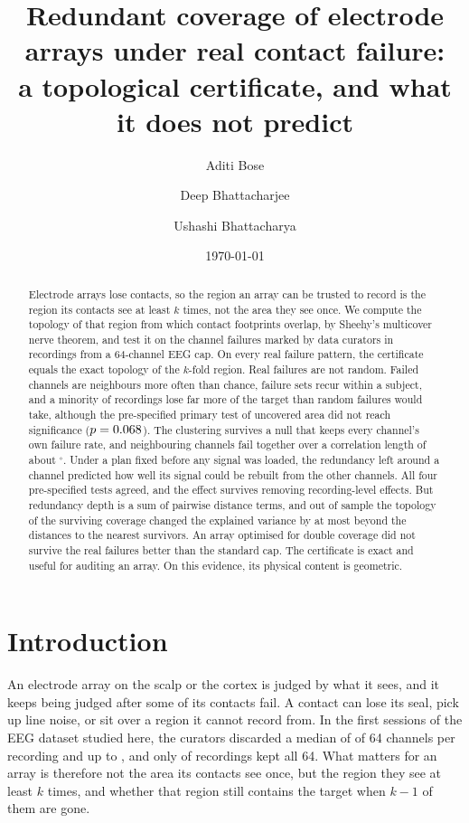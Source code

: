 \documentclass[11pt]{amsart}
\title[Redundant coverage under real contact failure]%
{Redundant coverage of electrode arrays under real contact failure:\\
a topological certificate, and what it does not predict}
\author{Aditi Bose}
\author[D. Bhattacharjee]{Deep Bhattacharjee}
\author[U. Bhattacharya]{Ushashi Bhattacharya}
\date{\today}
\theoremstyle{definition}
\theoremstyle{remark}
\begin{document}
\begin{abstract}
Electrode arrays lose contacts, so the region an array can be trusted to
record is the region its contacts see at least $k$ times, not the area they
see once. We compute the topology of that region from which contact
footprints overlap, by Sheehy's multicover nerve theorem, and test it on the
channel failures marked by data curators in \nRec{} recordings from a
64-channel EEG cap. On every real failure pattern, the certificate equals the
exact topology of the $k$-fold region. Real failures are not random. Failed
channels are neighbours more often than chance, failure sets recur within a
subject, and a minority of recordings lose far more of the target than random
failures would take, although the pre-specified primary test of uncovered
area did not reach significance ($p=0.068$). The clustering survives a null that keeps every channel's own failure rate,
and neighbouring channels fail together over a correlation length of about
\xiOne$^\circ$. Under a plan
fixed before any signal was loaded, the redundancy left around a channel
predicted how well its signal could be rebuilt from the other channels. All
four pre-specified tests agreed, and the effect survives removing
recording-level effects. But redundancy depth is a sum of pairwise distance
terms, and out of sample the topology of the surviving coverage changed the
explained variance by at most \topoGainBound{} beyond the distances to the
nearest survivors. An array optimised for double coverage did not survive the
real failures better than the standard cap. The certificate is exact and
useful for auditing an array. On this evidence, its physical content is
geometric.
\end{abstract}

\maketitle

\section{Introduction}

An electrode array on the scalp or the cortex is judged by what it sees, and
it keeps being judged after some of its contacts fail. A contact can lose its
seal, pick up line noise, or sit over a region it cannot record from. In the
first sessions of the EEG dataset studied here, the curators discarded a
median of \failMedian{} of 64 channels per recording and up to \failMax{}, and
only \failNone{} of \nTone{} recordings kept all 64. What
matters for an array is therefore not the area its contacts see once, but the
region they see at least $k$ times, and whether that region still contains the
target when $k-1$ of them are gone.
\end{document}
